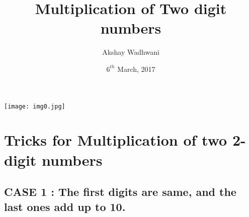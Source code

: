 \documentclass[11pt]{article}
\title{Multiplication of Two digit numbers}
\author{Akshay Wadhwani}
\date{$6^{th}$ March, 2017}
\begin{document}
\begin{titlepage}
\maketitle
 \begin{center}
        \vspace{0.8cm}
        \texttt{[image: img0.jpg]}        
  \end{center}      
\end{titlepage}
\tableofcontents
\newpage
\section{Tricks for Multiplication of two 2-digit numbers}
\subsection{CASE 1 : The first digits are same, and the last ones add up to 10.}
\end{document}
